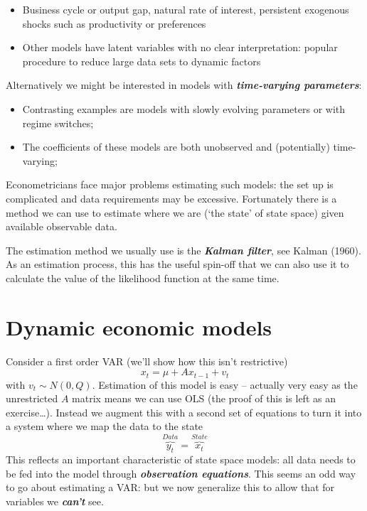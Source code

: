 \documentclass[
  letterpaper,
]{book}
\providecommand{\tightlist}{%
  \setlength{\itemsep}{0pt}\setlength{\parskip}{0pt}}\usepackage{longtable,booktabs,array}
\begin{document}
\begin{itemize}
\tightlist
\item
  Business cycle or output gap, natural rate of interest, persistent
  exogenous shocks such as productivity or preferences
\item
  Other models have latent variables with no clear interpretation:
  popular procedure to reduce large data sets to dynamic factors
\end{itemize}

Alternatively we might be interested in models with
\textbf{\emph{time-varying parameters}}:

\begin{itemize}
\tightlist
\item
  Contrasting examples are models with slowly evolving parameters or
  with regime switches;
\item
  The coefficients of these models are both unobserved and (potentially)
  time-varying;
\end{itemize}

Econometricians face major problems estimating such models: the set up
is complicated and data requirements may be excessive. Fortunately there
is a method we can use to estimate where we are (`the state' of state
space) given available observable data.

The estimation method we usually use is the \textbf{\emph{Kalman
filter}}, see Kalman (1960). As an estimation process, this has the
useful spin-off that we can also use it to calculate the value of the
likelihood function at the same time.

\hypertarget{dynamic-economic-models}{%
\section{Dynamic economic models}\label{dynamic-economic-models}}

Consider a first order VAR (we'll show how this isn't restrictive) \[
     x_t = \mu + A x_{t-1} + v_t
\] with \(v_t\sim N(0,Q)\). Estimation of this model is easy -- actually
very easy as the unrestricted \(A\) matrix means we can use OLS (the
proof of this is left as an exercise\ldots). Instead we augment this
with a second set of equations to turn it into a system where we map the
data to the state \[
    \overbrace{y_t}^{Data} = \overbrace{x_t}^{State}
\] This reflects an important characteristic of state space models: all
data needs to be fed into the model through \textbf{\emph{observation
equations}}. This seems an odd way to go about estimating a VAR: but we
now generalize this to allow that for variables we \textbf{\emph{can't}}
see.
\end{document}
